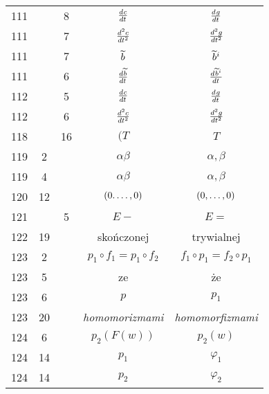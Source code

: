 \documentclass[a4paper,11pt]{article}
\begin{document}
\begin{center}
\begin{tabular}{|c|c|c|c|c|}
    111 & &  8 & $\frac{ d^{   } {  c  } }{ d {  t  }^{   } }$ & $\frac{ d^{   } {  g  } }{ d {  t  }^{   } }$ \\
    111 & &  7 & $\frac{ d^{  2  } {  c  } }{ d {  t  }^{  2  } }$ & $\frac{ d^{  2  } {  g  } }{ d {  t  }^{  2  } }$ \\
    111 & &  7 & $\widetilde{ b }$ & $\widetilde{ b }^{ i }$ \\
    111 & &  6 & $\frac{ d^{   } {  \widetilde{ b }  } }{ d {  t  }^{   } }$
           & $\frac{ d^{   } {  \widetilde{ b }^{ i }  } }{ d {  t  }^{   } }$ \\
    112 & &  5 & $\frac{ d^{   } {  c  } }{ d {  t  }^{   } }$ & $\frac{ d^{   } {  g  } }{ d {  t  }^{   } }$ \\
    112 & &  6 & $\frac{ d^{  2  } {  c  } }{ d {  t  }^{  2  } }$ & $\frac{ d^{  2  } {  g  } }{ d {  t  }^{  2  } }$ \\
    118 & & 16 & $( T$ & $T$ \\
    119 &  2 & & $\alpha\beta$ & $\alpha, \beta$ \\
    119 &  4 & & $\alpha\beta$ & $\alpha, \beta$ \\
    120 & 12 & & $( 0. \ldots, 0 )$ & $( 0, \ldots, 0 )$ \\
    121 & &  5 & $E -$ & $E =$ \\
    122 & 19 & & skończonej & trywialnej \\
    123 &  2 & & $p_{ 1 } \circ f_{ 1 } = p_{ 1 } \circ f_{ 2 }$
           & $f_{ 1 } \circ p_{ 1 } = f_{ 2 } \circ p_{ 1 }$ \\
    123 &  5 & & ze & że \\
    123 &  6 & & $p$ & $p_{ 1 }$ \\
    123 & 20 & & \emph{homomorizmami} & \emph{homomorfizmami} \\
    124 &  6 & & $p_{ 2 }( F( w ) )$ & $p_{ 2 }( w )$ \\
    124 & 14 & & $p_{ 1 }$ & $\varphi_{ 1 }$ \\
    124 & 14 & & $p_{ 2 }$ & $\varphi_{ 2 }$ \\
    \hline
  \end{tabular}



\end{center}
\end{document}
